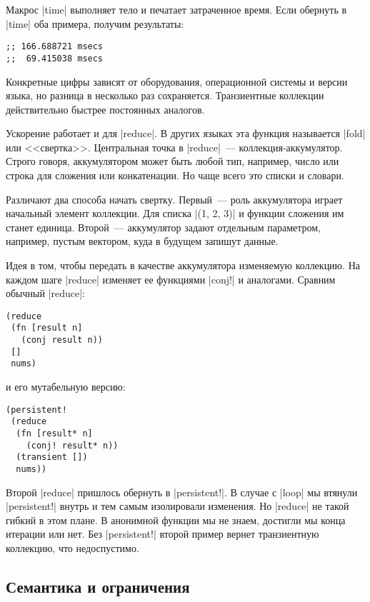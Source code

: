 Макрос \spverb|time| выполняет тело и печатает затраченное время. Если обернуть
в \spverb|time| оба примера, получим результаты:

\begin{verbatim}
;; 166.688721 msecs
;;  69.415038 msecs
\end{verbatim}

Конкретные цифры зависят от оборудования, операционной системы и версии языка,
но разница в несколько раз сохраняется. Транзиентные коллекции действительно
быстрее постоянных аналогов.

Ускорение работает и для \spverb|reduce|. В других языках эта функция называется
\spverb|fold| или <<свертка>>. Центральная точка в \spverb|reduce|~---
коллекция-аккумулятор. Строго говоря, аккумулятором может быть любой тип,
например, число или строка для сложения или конкатенации. Но чаще всего это
списки и словари.

Различают два способа начать свертку. Первый~--- роль аккумулятора играет
начальный элемент коллекции. Для списка \spverb|(1, 2, 3)| и функции сложения им
станет единица. Второй~--- аккумулятор задают отдельным параметром, например,
пустым вектором, куда в будущем запишут данные.

Идея в том, чтобы передать в качестве аккумулятора изменяемую коллекцию. На
каждом шаге \spverb|reduce| изменяет ее функциями \spverb|conj!| и
аналогами. Сравним обычный \spverb|reduce|:

\begin{verbatim}
(reduce
 (fn [result n]
   (conj result n))
 []
 nums)
\end{verbatim}

\noindent
и его мутабельную версию:

\begin{verbatim}
(persistent!
 (reduce
  (fn [result* n]
    (conj! result* n))
  (transient [])
  nums))
\end{verbatim}

Второй \spverb|reduce| пришлось обернуть в \spverb|persistent!|. В случае с
\spverb|loop| мы втянули \spverb|persistent!| внутрь и тем самым изолировали
изменения. Но \spverb|reduce| не такой гибкий в этом плане. В анонимной функции
мы не знаем, достигли мы конца итерации или нет. Без \spverb|persistent!| второй
пример вернет транзиентную коллекцию, что недоспустимо.


\subsection{Семантика и ограничения}

